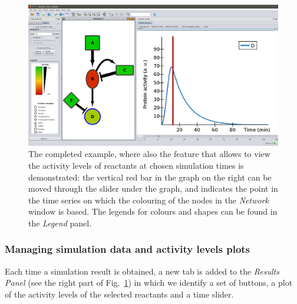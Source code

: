 \documentclass{article}
\begin{document}
\begin{figure}[!tpb]
\begin{minipage}{\textwidth}
\begin{center}
  \includegraphics[width=.9\textheight, angle=90]{images/esempio_uso_ANIMO_new}
\end{center}
\caption{The completed example, where also the feature that allows to view the activity levels
of reactants at chosen simulation times is demonstrated: the vertical red bar in the graph on the
right can be moved through the slider under the graph, and indicates the point in the time series
on which the colouring of the nodes in the \emph{Network} window is based.
The legends for colours and shapes can be found in the \emph{Legend} panel.}\label{fig:rete-esempio}
\end{minipage}
\end{figure}


\subsubsection{Managing simulation data and activity levels plots}
Each time a simulation result is obtained, a new tab is added to the \emph{Results Panel} (see the right part of Fig.~\ref{fig:rete-esempio})
in which we identify a set of buttons, a plot of the activity levels of the selected reactants and a time slider.
\end{document}
